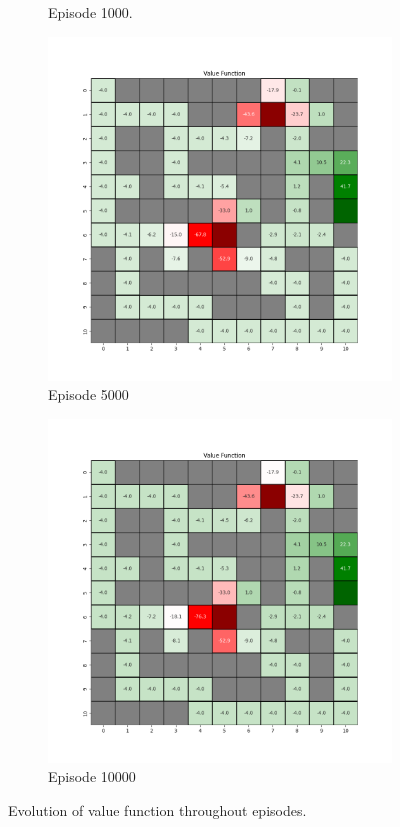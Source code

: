 \documentclass{assignment}
\begin{document}
\begin{figure}[H]
\begin{subfigure}{0.3\textwidth}
    \caption{Episode 1000.}
    \end{subfigure}\hfill
    \begin{subfigure}{0.3\textwidth}
        \includegraphics[width=\textwidth]{figures/value_td/gamma_sweep/value_function_alpha_0.1_gamma_0.75_epsilon_0.2_iteration_5000.png}
    \caption{Episode 5000}
    \end{subfigure}\hfill
    \begin{subfigure}{0.3\textwidth}
        \includegraphics[width=\textwidth]{figures/value_td/gamma_sweep/value_function_alpha_0.1_gamma_0.75_epsilon_0.2_iteration_10000.png}
    \caption{Episode 10000}
    \end{subfigure}
    \caption{Evolution of value function throughout episodes.}
    \label{fig:gamma_0.75_td_learning_value}
\end{figure}
\end{document}
